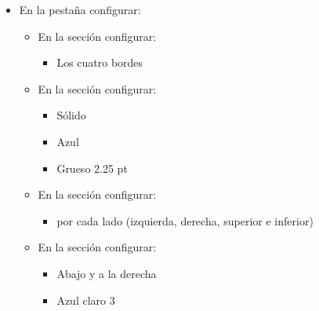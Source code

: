 \documentclass[letterpaper,10pt,spanish]{sphinxmanual}
\begin{document}
\begin{enumerate}
\begin{itemize}
\begin{itemize}
\end{itemize}

\item {} 
\sphinxAtStartPar
En la pestaña  configurar:
\begin{itemize}
\item {} 
\sphinxAtStartPar
En la sección  configurar:
\begin{itemize}
\item {} 
\sphinxAtStartPar
{} Los cuatro bordes

\end{itemize}

\item {} 
\sphinxAtStartPar
En la sección  configurar:
\begin{itemize}
\item {} 
\sphinxAtStartPar
{} Sólido

\item {} 
\sphinxAtStartPar
{} Azul

\item {} 
\sphinxAtStartPar
{} Grueso 2.25 pt

\end{itemize}

\item {} 
\sphinxAtStartPar
En la sección  configurar:
\begin{itemize}
\item {} 
\sphinxAtStartPar
0.50cm por cada lado (izquierda, derecha, superior e inferior)

\end{itemize}

\item {} 
\sphinxAtStartPar
En la sección  configurar:
\begin{itemize}
\item {} 
\sphinxAtStartPar
{} Abajo y a la derecha

\item {} 
\sphinxAtStartPar
{} Azul claro 3

\end{itemize}

\end{itemize}

\end{itemize}


\end{enumerate}
\end{document}
